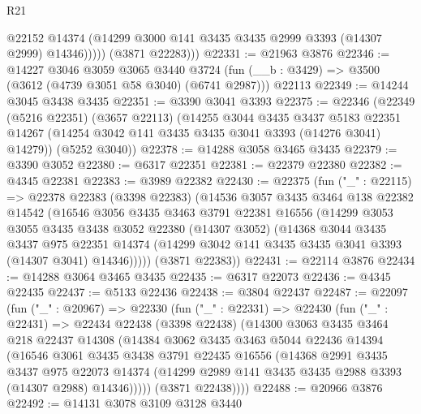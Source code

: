 \begin{lexlean}{R21}
\begin{coremodule}
                @22152
                @14374
                (@14299 @3000 @141 @3435 @3435 @2999 @3393 (@14307 @2999) @14346)))))
        (@3871 @22283)))
@22331 := @21963 @3876
@22346 := @14227
    @3046
    @3059
    @3065
    @3440
    @3724
    (fun (__b : @3429) => @3500 (@3612 (@4739 @3051 @58 @3040) (@6741 @2987)))
    @22113
@22349 := @14244 @3045 @3438 @3435
@22351 := @3390 @3041 @3393
@22375 := @22346
    (@22349
      (@5216 @22351)
      (@3657 @22113)
      (@14255
        @3044
        @3435
        @3437
        @5183
        @22351
        @14267
        (@14254 @3042 @141 @3435 @3435 @3041 @3393 (@14276 @3041) @14279))
      (@5252 @3040))
@22378 := @14288 @3058 @3465 @3435
@22379 := @3390 @3052
@22380 := @6317 @22351
@22381 := @22379 @22380
@22382 := @4345 @22381
@22383 := @3989 @22382
@22430 := @22375
    (fun ("_" : @22115) =>
    @22378
      @22383
      (@3398 @22383)
      (@14536
        @3057
        @3435
        @3464
        @138
        @22382
        @14542
        (@16546
          @3056
          @3435
          @3463
          @3791
          @22381
          @16556
          (@14299
            @3053
            @3055
            @3435
            @3438
            @3052
            @22380
            (@14307 @3052)
            (@14368
              @3044
              @3435
              @3437
              @975
              @22351
              @14374
              (@14299 @3042 @141 @3435 @3435 @3041 @3393 (@14307 @3041) @14346)))))
      (@3871 @22383))
@22431 := @22114 @3876
@22434 := @14288 @3064 @3465 @3435
@22435 := @6317 @22073
@22436 := @4345 @22435
@22437 := @5133 @22436
@22438 := @3804 @22437
@22487 := @22097
    (fun ("_" : @20967) =>
    @22330
      (fun ("_" : @22331) =>
      @22430
        (fun ("_" : @22431) =>
        @22434
          @22438
          (@3398 @22438)
          (@14300
            @3063
            @3435
            @3464
            @218
            @22437
            @14308
            (@14384
              @3062
              @3435
              @3463
              @5044
              @22436
              @14394
              (@16546
                @3061
                @3435
                @3438
                @3791
                @22435
                @16556
                (@14368
                  @2991
                  @3435
                  @3437
                  @975
                  @22073
                  @14374
                  (@14299 @2989 @141 @3435 @3435 @2988 @3393 (@14307 @2988) @14346)))))
          (@3871 @22438))))
@22488 := @20966 @3876
@22492 := @14131 @3078 @3109 @3128 @3440

\end{coremodule}
\end{lexlean}
